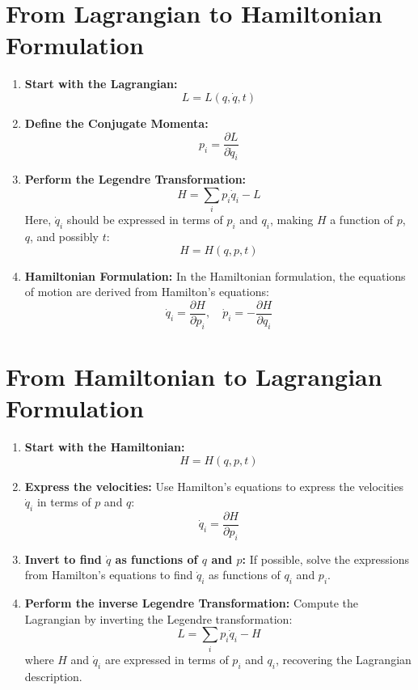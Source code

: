 \documentclass{article}
\begin{document}
\section*{From Lagrangian to Hamiltonian Formulation}

\begin{enumerate}
    \item \textbf{Start with the Lagrangian:}
    \[
    L = L(q, \dot{q}, t)
    \]

    \item \textbf{Define the Conjugate Momenta:}
    \[
    p_i = \frac{\partial L}{\partial \dot{q}_i}
    \]

    \item \textbf{Perform the Legendre Transformation:}
    \[
    H = \sum_i p_i \dot{q}_i - L
    \]
    Here, \( \dot{q}_i \) should be expressed in terms of \( p_i \) and \( q_i \), making \( H \) a function of \( p \), \( q \), and possibly \( t \):
    \[
    H = H(q, p, t)
    \]

    \item \textbf{Hamiltonian Formulation:}
    In the Hamiltonian formulation, the equations of motion are derived from Hamilton's equations:
    \[
    \dot{q}_i = \frac{\partial H}{\partial p_i}, \quad \dot{p}_i = -\frac{\partial H}{\partial q_i}
    \]
\end{enumerate}

\section*{From Hamiltonian to Lagrangian Formulation}

\begin{enumerate}
    \item \textbf{Start with the Hamiltonian:}
    \[
    H = H(q, p, t)
    \]

    \item \textbf{Express the velocities:}
    Use Hamilton's equations to express the velocities \( \dot{q}_i \) in terms of \( p \) and \( q \):
    \[
    \dot{q}_i = \frac{\partial H}{\partial p_i}
    \]

    \item \textbf{Invert to find \( \dot{q} \) as functions of \( q \) and \( p \):}
    If possible, solve the expressions from Hamilton's equations to find \( \dot{q}_i \) as functions of \( q_i \) and \( p_i \).

    \item \textbf{Perform the inverse Legendre Transformation:}
    Compute the Lagrangian by inverting the Legendre transformation:
    \[
    L = \sum_i p_i \dot{q}_i - H
    \]
    where \( H \) and \( \dot{q}_i \) are expressed in terms of \( p_i \) and \( q_i \), recovering the Lagrangian description.
\end{enumerate}
\end{document}
